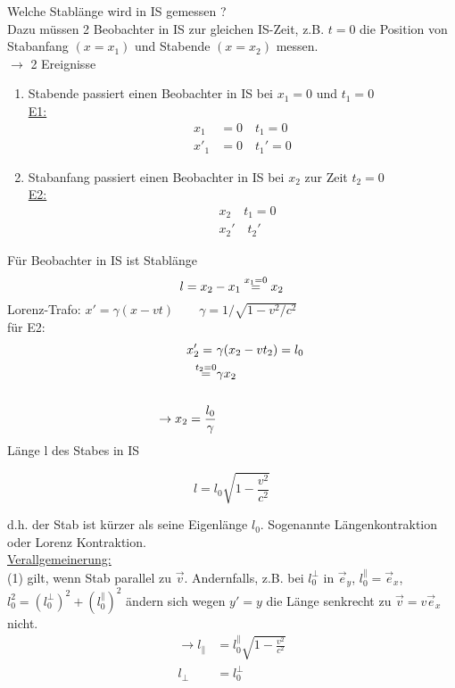 \documentclass[titlepage,12pt,a4paper,ngerman]{report}
\newcommand{\frbox}[2]{\begin{tcolorbox}[colback=white,colframe=red!75!black,fonttitle=\bfseries,title=#1]#2\end{tcolorbox}} %
\begin{document}
{Welche Stablänge wird in IS gemessen ?\\
Dazu müssen 2 Beobachter in IS zur gleichen IS-Zeit, z.B. $ t=0 $ die Position von Stabanfang $ (x=x_1) $ und Stabende $ (x=x_2) $ messen.\\
$ \rightarrow $ 2 Ereignisse
\begin{enumerate}[1)]
	\item Stabende passiert einen Beobachter in IS bei $ x_1 = 0 $ und $ t_1 = 0 $\\
	\underline{E1:}
	\begin{align*}
	x_1 &= 0 \quad t_1 = 0\\
	x'_1 &= 0 \quad t_1' = 0
	\end{align*}
	\item Stabanfang passiert einen Beobachter in IS bei $ x_2 $ zur Zeit $ t_2 = 0 $\\
	\underline{E2:}
	\begin{align*}
	&x_2 \quad t_1 = 0\\
	&x_2' \quad t_2'
	\end{align*}
\end{enumerate}
Für Beobachter in IS ist Stablänge
$$ l = x_2 - x_1 \buildrel x_1 = 0 \over = x_2 $$
Lorenz-Trafo: $ x' = \gamma (x-vt) \qquad \gamma = 1 / \sqrt{1-v^2/c^2} $\\
für E2:
\begin{align*}
x_2' = \  &\gamma (x_2 - v t_2) = l_0 \\
\buildrel t_2 = 0 \over = &\gamma x_2 \\\\
\rightarrow x_2 = \frac{l_0}{\gamma}
\end{align*}
Länge l des Stabes in IS 
\frbox{Längenkontraktion}{
\begin{equation*}
l = l_0 \sqrt{1-\frac{v^2}{c^2}} \tag{1}
\end{equation*}}
d.h. der Stab ist kürzer als seine Eigenlänge $ l_0 $. Sogenannte Längenkontraktion oder Lorenz Kontraktion.\\[5pt]
\underline{Verallgemeinerung:}\\
(1) gilt, wenn Stab parallel zu $ \vec{v} $. Andernfalls, z.B. bei $ l_0^\perp $ in $ \vec{e}_y $, $ l_0^\parallel = \vec{e}_x $, $ l_0^2 = (l_0^\perp)^2 + (l_0^\parallel)^2  $ ändern sich wegen $ y' = y $ die Länge senkrecht zu $ \vec{v} = v \vec{e}_x $ nicht.
\begin{align*}
\rightarrow l_{\parallel} &= l_0 ^\parallel \sqrt{1-\frac{v^2}{c^2}}\\
l_{\perp} &= l_0^\perp

\end{align*}}
\end{document}
